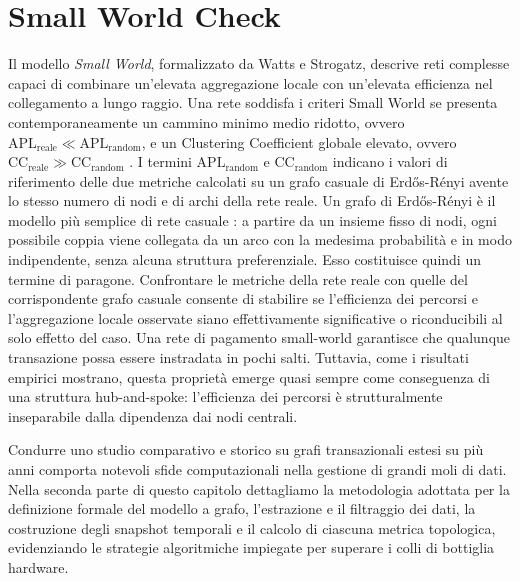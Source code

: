 \documentclass[12pt,a4paper,oneside]{book}
\begin{document}
\section{Small World Check}
Il modello \textit{Small World}, formalizzato da Watts e Strogatz, descrive reti complesse capaci di combinare un'elevata aggregazione locale con un'elevata efficienza nel collegamento a lungo raggio. Una rete soddisfa i criteri Small World se presenta contemporaneamente un cammino minimo medio ridotto, ovvero $\text{APL}_{\text{reale}} \ll \text{APL}_{\text{random}}$, e un Clustering Coefficient globale elevato, ovvero $\text{CC}_{\text{reale}} \gg \text{CC}_{\text{random}}$ \cite{MagnaniMarzolla2026}. I termini $\text{APL}_{\text{random}}$ e $\text{CC}_{\text{random}}$ indicano i valori di riferimento delle due metriche calcolati su un grafo casuale di Erdős-Rényi avente lo stesso numero di nodi e di archi della rete reale. Un grafo di Erdős-Rényi è il modello più semplice di rete casuale \cite{BarabasiAlbert1999}: a partire da un insieme fisso di nodi, ogni possibile coppia viene collegata da un arco con la medesima probabilità e in modo indipendente, senza alcuna struttura preferenziale. Esso costituisce quindi un termine di paragone. Confrontare le metriche della rete reale con quelle del corrispondente grafo casuale consente di stabilire se l'efficienza dei percorsi e l'aggregazione locale osservate siano effettivamente significative o riconducibili al solo effetto del caso. Una rete di pagamento small-world garantisce che qualunque transazione possa essere instradata in pochi salti. Tuttavia, come i risultati empirici mostrano, questa proprietà emerge quasi sempre come conseguenza di una struttura hub-and-spoke: l'efficienza dei percorsi è strutturalmente inseparabile dalla dipendenza dai nodi centrali.

Condurre uno studio comparativo e storico su grafi transazionali estesi su più anni comporta notevoli sfide computazionali nella gestione di grandi moli di dati. Nella seconda parte di questo capitolo dettagliamo la metodologia adottata per la definizione formale del modello a grafo, l'estrazione e il filtraggio dei dati, la costruzione degli snapshot temporali e il calcolo di ciascuna metrica topologica, evidenziando le strategie algoritmiche impiegate per superare i colli di bottiglia hardware.
\end{document}
